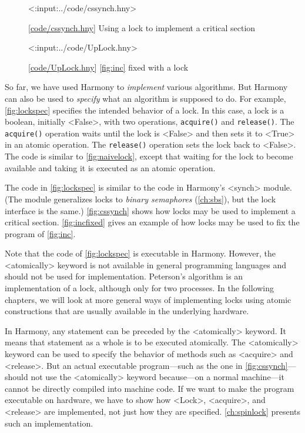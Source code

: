 \documentclass{report}
\newcommand{\harmonylink}[1]{%
[\href{https://harmony.cs.cornell.edu/#1}{\underline{#1}}]%
}
\newenvironment{code}{
\tcolorbox
}{
\endtcolorbox
}
\begin{document}
\begin{figure}
\begin{code}
<{:input:../code/cssynch.hny}>
\end{code}
\caption{\harmonylink{code/cssynch.hny} Using a lock to implement a
critical section}
\label{fig:cssynch}
\end{figure}

\begin{figure}
\begin{code}
<{:input:../code/UpLock.hny}>
\end{code}
\caption{\harmonylink{code/UpLock.hny} \autoref{fig:inc} fixed with a lock}
\label{fig:incfixed}
\end{figure}

So far, we have used Harmony to \emph{implement} various algorithms.
But Harmony can also be used to \emph{specify} what an algorithm is
supposed to do.
For example, \autoref{fig:lockspec} specifies the intended behavior
of a lock.
In this case, a lock is a boolean, initially <{False}>,
with two operations, \texttt{acquire()} and \texttt{release()}.
The \texttt{acquire()} operation waits until the lock is <{False}>
and then sets it to <{True}> in an atomic operation.
The \texttt{release()} operation sets the lock back to <{False}>.
The code is similar to \autoref{fig:naivelock}, except that waiting
for the lock to become available and taking it is executed as an
atomic operation.

The code in \autoref{fig:lockspec} is similar to the code in
Harmony's <{synch}> module.
(The module generalizes locks to \emph{binary semaphores}
(\autoref{ch:sbs}), but the lock interface is the same.)
\autoref{fig:cssynch} shows how locks may be used to implement
a critical section.
\autoref{fig:incfixed} gives an example of how locks may be used
to fix the program of \autoref{fig:inc}.

Note that the code of \autoref{fig:lockspec} is executable in Harmony.
However, the <{atomically}> keyword is not available in general
programming languages and should not be used for implementation.
Peterson's algorithm is an implementation of a lock, although only for
two processes.  In the following chapters, we will look at more general
ways of implementing locks using atomic constructions that are usually
available in the underlying hardware.

In Harmony, any statement can be preceded by the <{atomically}>
keyword.  It means that statement as a whole is to be executed atomically.
The <{atomically}> keyword can be used to specify the behavior of
methods such as <{acquire}> and <{release}>.  But
an actual executable program---such as the one in
\autoref{fig:cssynch}---should not use the <{atomically}> keyword
because---on a normal machine---it cannot be directly compiled into
machine code.
If we want to make the program executable on hardware,
we have to show how <{Lock}>, <{acquire}>, and <{release}>
are implemented, not just how they are specified.
\autoref{ch:spinlock} presents such an implementation.
\end{document}
